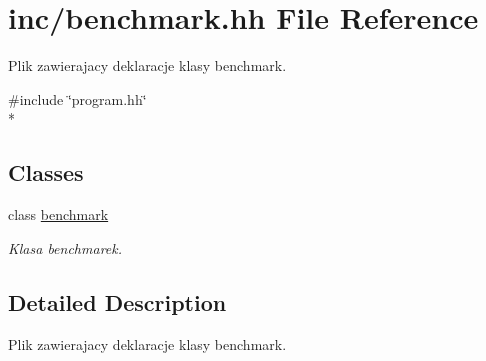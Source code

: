 \hypertarget{benchmark_8hh}{\section{inc/benchmark.hh File Reference}
\label{benchmark_8hh}
}


Plik zawierajacy deklaracje klasy benchmark.  


{\ttfamily \#include \char`\"{}program.\-hh\char`\"{}}\\*
\subsection*{Classes}
\begin{DoxyCompactItemize}
\item 
class \hyperlink{classbenchmark}{benchmark}
\begin{DoxyCompactList}\small\item\em Klasa benchmarek. \end{DoxyCompactList}\end{DoxyCompactItemize}


\subsection{Detailed Description}
Plik zawierajacy deklaracje klasy benchmark. 